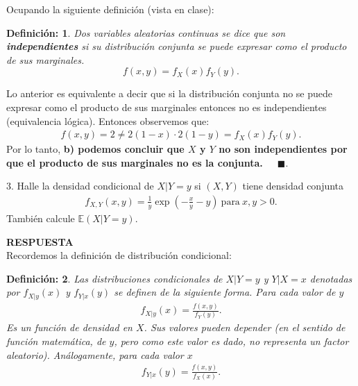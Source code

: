 \documentclass[11pt,letterpaper]{article}
\newcommand{\mE}{\mathbb{E}}
\newcommand{\res}{\textbf{RESPUESTA}\\}
\newcommand{\fin}{$\blacksquare.$}
\newtheorem{thmd}{Definición:}
\newcommand{\fx}{f_X(x)}
\newcommand{\fy}{f_Y(y)}
\begin{document}
Ocupando la siguiente definición (vista en clase):
\begin{framed}
    \begin{thmd} \label{independencia}
    Dos variables aleatorias continuas se dice que son \textbf{independientes} si su distribución conjunta se puede expresar como el producto de sus marginales.
    $$f(x,y)=f_X(x)f_Y(y).$$
    \end{thmd}
\end{framed} 
Lo anterior es equivalente a decir que si la distribución conjunta no se puede expresar como el producto de sus marginales entonces no es independientes (equivalencia lógica). Entonces observemos que:
\begin{align*}
f(x,y)=2\neq 2(1-x)\cdot 2(1-y)=\fx \fy .
\end{align*}
Por lo tanto, \textbf{b) podemos concluir que $X$ y $Y$ no son independientes por que el producto de sus marginales no es la conjunta.}\ \ \  \fin
 
3. Halle la densidad condicional de $X|Y=y$ si $(X,Y)$ tiene densidad conjunta \begin{align*}
f_{X,Y}(x,y)=\frac{1}{y}\exp \left(-\frac{x}{y}-y \right) \ \text{para} \ x,y>0.
\end{align*} 
También calcule $\mE(X|Y=y)$.

\res Recordemos la definición de distribución condicional:
\begin{framed}
    \begin{thmd} \label{distribucion_condicional}
    Las distribuciones condicionales de $X|Y=y$ y $Y|X=x$ denotadas por $f_{X|y}(x)$ y $f_{Y|x}(y)$ se definen de la siguiente forma. Para cada valor de $y$ 
    \begin{align*}
f_{X|y}(x)=\frac{f(x,y)}{f_Y(y)}.
\end{align*}
Es un función de densidad en $X$. Sus valores pueden depender (en el sentido de función matemática, de $y$, pero como este valor es dado, no representa un factor aleatorio). Análogamente, para cada valor $x$
	   \begin{align*}
	f_{Y|x}(y)=\frac{f(x,y)}{f_X(x)}.
	\end{align*}
    \end{thmd}
\end{framed} 
\end{document}
